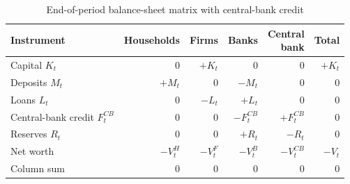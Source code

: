 \begin{table}[htbp]
  \centering
  \caption{End-of-period balance-sheet matrix with central-bank credit}
  \label{tab:sfc-simple-stocks}
  \renewcommand{\arraystretch}{1.2}
  \begin{tabular}{lrrrrr}
    \toprule
    Instrument
      & Households
      & Firms
      & Banks
      & \makecell{Central\\bank}
      & Total
    \\
    \midrule

    Capital $K_t$
      & $0$
      & $+K_t$
      & $0$
      & $0$
      & $+K_t$
    \\

    Deposits $M_t$
      & $+M_t$
      & $0$
      & $-M_t$
      & $0$
      & $0$
    \\

    Loans $L_t$
      & $0$
      & $-L_t$
      & $+L_t$
      & $0$
      & $0$
    \\

    Central-bank credit $F^{CB}_t$
      & $0$
      & $0$
      & $-F^{CB}_t$
      & $+F^{CB}_t$
      & $0$
    \\

    Reserves $R_t$
      & $0$
      & $0$
      & $+R_t$
      & $-R_t$
      & $0$
    \\

    Net worth
      & $-V^H_t$
      & $-V^F_t$
      & $-V^B_t$
      & $-V^{CB}_t$
      & $-V_t$
    \\
    \midrule

    Column sum
      & $0$
      & $0$
      & $0$
      & $0$
      & $0$
    \\
    \bottomrule
  \end{tabular}
\end{table}


